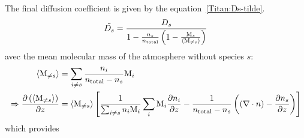 The final diffusion coefficient is given by the equation~\ref{Titan:Ds-tilde}.
\begin{equation}
\tilde{D_s} = \frac{D_s}{1-\frac{n_s}{n_\text{total}}\left(1 - \frac{\text{M}_s}{\langle\text{M}_{\neq s}\rangle}\right)}
\label{Titan:Ds-tilde}
\end{equation}
avec  the mean molecular mass of the atmosphere without
species $s$:
\begin{equation}
\begin{split}
\langle\text{M}_{\neq s}\rangle & = \sum_{i\neq s} \frac{n_i}{n_\text{total} - n_s}\text{M}_i\\
\Rightarrow \frac{\partial\left(\langle\text{M}_{\neq s}\rangle\right)}{\partial z} &
                = \langle\text{M}_{\neq s}\rangle\left[\frac{1}{\sum_{i\neq s}n_i\text{M}_i} \sum_i \text{M}_i\frac{\partial n_i}{\partial z}
                  - \frac{1}{n_\text{total} - n_s} \left(\left(\nabla\cdot{\ensuremath{n}}\right) - \frac{\partial n_s}{\partial z}\right)\right]
\end{split}
\end{equation}
which provides
